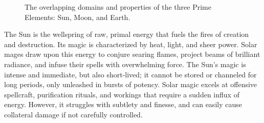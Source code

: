 \documentclass[12pt]{article}
\begin{document}
\begin{figure}[htb]
    \centering
    \caption{The overlapping domains and properties of the three Prime Elements: Sun, Moon, and Earth.}
    \label{fig:prime_elements_venn}
\end{figure}

The Sun is the wellspring of raw, primal energy that fuels the fires of creation and destruction. Its magic is characterized by heat, light, and sheer power. Solar mages draw upon this energy to conjure searing flames, project beams of brilliant radiance, and infuse their spells with overwhelming force. The Sun's magic is intense and immediate, but also short-lived; it cannot be stored or channeled for long periods, only unleashed in bursts of potency. Solar magic excels at offensive spellcraft, purification rituals, and workings that require a sudden influx of energy. However, it struggles with subtlety and finesse, and can easily cause collateral damage if not carefully controlled.
\end{document}
